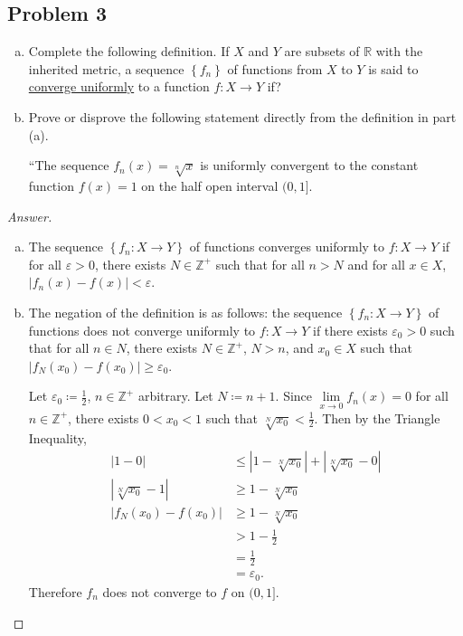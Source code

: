 \documentclass[12pt]{article}
\newcommand{\z}{\mathbb{Z}}
\newcommand{\real}{\mathbb{R}}
\newcommand\paren[1]{\left( #1 \right)}
\newcommand\setb[1]{\left \{ #1 \right \}}
\newcommand{\eps}{\varepsilon}
\theoremstyle{definition}
\begin{document}
\subsection{Problem 3}
\begin{enumerate}[a.]
    \item Complete the following definition. If $X$ and $Y$ are subsets of $\real$ with the inherited metric, a sequence $\setb{ f_n }$ of functions from $X$ to $Y$ is said to \underline{converge uniformly} to a function $f : X \to Y$ if?
    \item Prove or disprove the following statement directly from the definition in part (a).
    
    ``The sequence $f_n(x) = \sqrt[n]{x}$ is uniformly convergent to the constant function $f(x) = 1$ on the half open interval $(0,1]$.
\end{enumerate}
\begin{proof}[Answer]
    \noindent
    \begin{enumerate}[a.]
        \item The sequence $\setb{ f_n : X \to Y }$ of functions converges uniformly to $f : X \to Y$ if for all $\eps > 0$, there exists $N \in \z^+$ such that for all $n > N$ and for all $x \in X$, $|f_n(x) - f(x)| < \eps$.
        \item The negation of the definition is as follows: the sequence $\setb{ f_n : X \to Y }$ of functions does not converge uniformly to $f : X \to Y$ if there exists $\eps_0 > 0$ such that for all $n \in N$, there exists $N \in \z^+$, $N > n$, and $x_0 \in X$ such that $\left| f_N \paren{ x_0 } - f \paren{ x_0 } \right| \geq \eps_0$. 
        
        Let $\eps_0 \coloneqq \frac{1}{2}$, $n \in \z^+$ arbitrary. Let $N \coloneqq n + 1$. Since $\lim\limits_{x \to 0} f_n(x) = 0$ for all $n \in \z^+$, there exists $0 < x_0 < 1$ such that $\sqrt[N]{x_0} < \frac{1}{2}$. Then by the Triangle Inequality,
        \begin{align*}
            |1-0| & \leq \left| 1 - \sqrt[N]{x_0} \right| + \left| \sqrt[N]{x_0} - 0 \right| \\
            \left| \sqrt[N]{x_0} - 1 \right| & \geq 1 - \sqrt[N]{x_0} \\
            \left| f_N \paren{x_0} - f \paren{x_0} \right| & \geq 1 - \sqrt[N]{x_0} \\ 
            & > 1 - \frac{1}{2} \\
            & = \frac{1}{2} \\
            & = \eps_0.
        \end{align*}
        Therefore $f_n$ does not converge to $f$ on $(0,1]$.
    \end{enumerate}
\end{proof}
\end{document}
